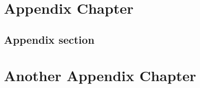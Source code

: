 \appendix
\chapter{Appendix Chapter}

\section{Appendix section}
\blindtext[1]

\chapter{Another Appendix Chapter}
\blindtext[1]